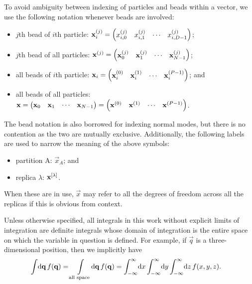 To avoid ambiguity between indexing of particles and beads within a vector, we use the following notation whenever beads are involved:
\begin{itemize}
	\item $j$th bead of $i$th particle: $\bm{\mathbf{x}}_i^{(j)} = \begin{pmatrix} x_{i,0}^{(j)} & x_{i,1}^{(j)} & \cdots & x_{i,D-1}^{(j)} \end{pmatrix}$;
	\item $j$th bead of all particles: $\bm{\mathbf{x}}^{(j)} = \begin{pmatrix} \bm{\mathbf{x}}_0^{(j)} & \bm{\mathbf{x}}_1^{(j)} & \cdots & \bm{\mathbf{x}}_{N-1}^{(j)} \end{pmatrix}$;
	\item all beads of $i$th particle: $\bm{\mathbf{x}}_i = \begin{pmatrix} \bm{\mathbf{x}}_i^{(0)} & \bm{\mathbf{x}}_i^{(1)} & \cdots & \bm{\mathbf{x}}_i^{(P-1)} \end{pmatrix}$; and
	\item all beads of all particles: $\bm{\mathbf{x}} = \begin{pmatrix} \bm{\mathbf{x}}_0 & \bm{\mathbf{x}}_1 & \cdots & \bm{\mathbf{x}}_{N-1} \end{pmatrix} = \begin{pmatrix} \bm{\mathbf{x}}^{(0)} & \bm{\mathbf{x}}^{(1)} & \cdots & \bm{\mathbf{x}}^{(P-1)} \end{pmatrix}$.
\end{itemize}
The bead notation is also borrowed for indexing normal modes, but there is no contention as the two are mutually exclusive.
Additionally, the following labels are used to narrow the meaning of the above symbols:
\begin{itemize}
	\item partition A: $\vec{x}_A$; and
	\item replica $\lambda$: $\bm{\mathbf{x}}^{[\lambda]}$.
\end{itemize}
When these are in use, $\vec{x}$ may refer to all the degrees of freedom across all the replicas if this is obvious from context.

Unless otherwise specified, all integrals in this work without explicit limits of integration are definite integrals whose domain of integration is the entire space on which the variable in question is defined.
For example, if $\vec{q}$ is a three-dimensional position, then we implicitly have
\begin{align}
	\int\! \dif \vec{q} \, f(\vec{q})
	&= \int\limits_\text{all space}\! \dif \vec{q} \, f(\vec{q})
	= \int_{-\infty}^\infty\! \dif x \int_{-\infty}^\infty\! \dif y \int_{-\infty}^\infty\! \dif z \, f(x, y, z).
\end{align}

